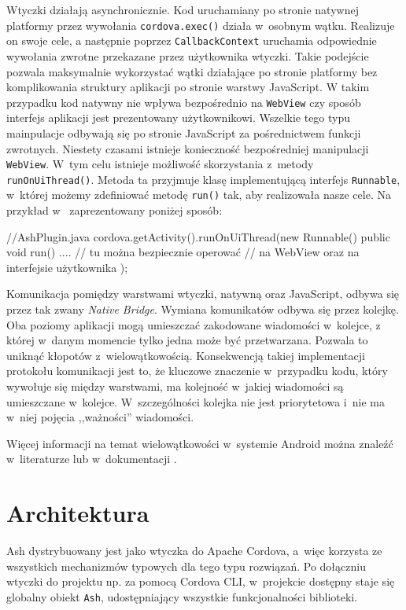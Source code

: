 \documentclass[brudnopis]{xmgr}
\begin{document}
Wtyczki działają asynchronicznie. Kod uruchamiany po stronie natywnej platformy przez wywołania \texttt{cordova.exec()} działa w~osobnym wątku. Realizuje on swoje cele, a następnie poprzez \texttt{CallbackContext} uruchamia odpowiednie wywołania zwrotne przekazane przez użytkownika wtyczki. Takie podejście pozwala maksymalnie wykorzystać wątki działające po stronie platformy bez komplikowania struktury aplikacji po stronie warstwy JavaScript. W takim przypadku kod natywny nie wpływa bezpośrednio na \texttt{WebView} czy sposób interfejs aplikacji jest prezentowany użytkownikowi. Wszelkie tego typu mainpulacje odbywają się po stronie JavaScript za pośrednictwem funkcji zwrotnych. Niestety czasami istnieje konieczność bezpośredniej manipulacji \texttt{WebView}. W~tym celu istnieje możliwość skorzystania z~metody \texttt{runOnUiThread()}. Metoda ta przyjmuje klasę implementującą interfejs \texttt{Runnable}, w~której możemy zdefiniować metodę \texttt{run()} tak, aby realizowała nasze cele. Na przykład w~ zaprezentowany poniżej sposób:

\begin{javascriptcode}
//AshPlugin.java
cordova.getActivity().runOnUiThread(new Runnable() {
      public void run() {
   	....        
         // tu można bezpiecznie operować 
         //    na WebView oraz na interfejsie użytkownika
      }
});
\end{javascriptcode}

Komunikacja pomiędzy warstwami wtyczki, natywną oraz JavaScript, odbywa się przez tak zwany \textit{Native Bridge}. Wymiana komunikatów odbywa się przez kolejkę. Oba poziomy aplikacji mogą umieszczać zakodowane wiadomości w~kolejce, z której w~danym momencie tylko jedna może być przetwarzana. Pozwala to uniknąć kłopotów z~wielowątkowością. Konsekwencją takiej implementacji protokołu komunikacji jest to, że kluczowe znaczenie w~przypadku kodu, który wywołuje się między warstwami,  ma kolejność w~jakiej wiadomości są umieszczane w~kolejce. W~szczególności kolejka nie jest priorytetowa i~nie ma w~niej pojęcia ,,ważności'' wiadomości.

Więcej informacji na temat wielowątkowości w~systemie Android można znaleźć w~literaturze \cite{AndroidInPractice} lub w~dokumentacji \cite{AndroidDoc}. 

\chapter{Architektura}

Ash dystrybuowany jest jako wtyczka do Apache Cordova, a~więc korzysta ze wszystkich mechanizmów typowych dla tego typu rozwiązań. Po dołączniu wtyczki do projektu np. za pomocą Cordova CLI, w~projekcie dostępny staje się globalny obiekt \texttt{Ash}, udostępniający wszystkie funkcjonalności biblioteki. 
\end{document}
